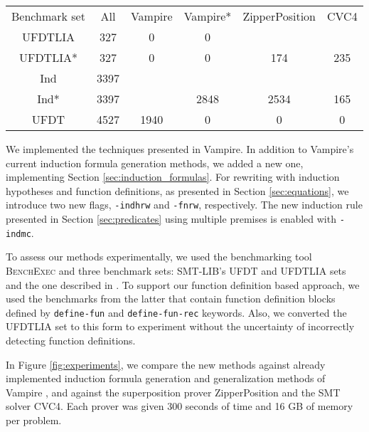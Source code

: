 
\begin{figure*}[tb]
    \begin{tabular}{|c|c|c|c|c|c|}
        Benchmark set&All&Vampire&Vampire*&ZipperPosition&CVC4\\
        UFDTLIA&327&0&0&&\\
        UFDTLIA*&327&0&0&174&235\\
        Ind&3397&&&&\\
        Ind*&3397&&2848&2534&165\\
        UFDT&4527&1940&0&0&0\\
    \end{tabular}
    \caption{Experiments}
    \label{fig:experiments}
\end{figure*}

We implemented the techniques presented in Vampire. In addition to Vampire's current induction formula generation methods, we added a new one, implementing Section \ref{sec:induction_formulas}. For rewriting with induction hypotheses and function definitions, as presented in Section \ref{sec:equations}, we introduce two new flags, \texttt{-indhrw} and \texttt{-fnrw}, respectively. The new induction rule presented in Section \ref{sec:predicates} using multiple premises is enabled with \texttt{-indmc}.

To assess our methods experimentally, we used the benchmarking tool \textsc{BenchExec} \cite{benchmarking,competitionresults} and three benchmark sets: SMT-LIB's UFDT and UFDTLIA sets and the one described in \cite{vampiregeneralization}. To support our function definition based approach, we used the benchmarks from the latter that contain function definition blocks defined by \texttt{define-fun} and \texttt{define-fun-rec} keywords. Also, we converted the UFDTLIA set to this form to experiment without the uncertainty of incorrectly detecting function definitions.


In Figure \ref{fig:experiments}, we compare the new methods against already implemented induction formula generation and generalization methods of Vampire \cite{vampiregeneralization}, and against the superposition prover ZipperPosition and the SMT solver CVC4. Each prover was given 300 seconds of time and 16 GB of memory per problem.